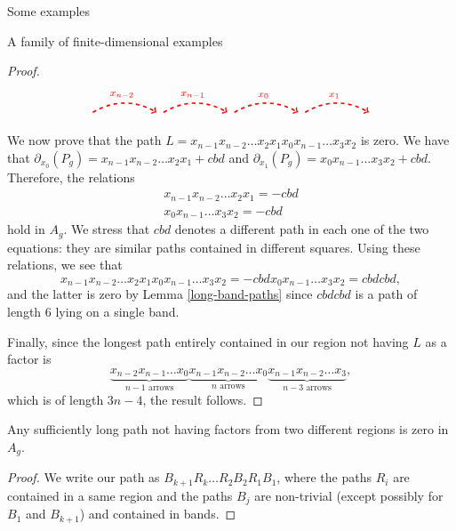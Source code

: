 \begin{chapter}{Some examples}
\begin{section}{A family of finite-dimensional examples}
\begin{proof}
\[\begin{tikzpicture}[text width=1.5mm, font=\footnotesize]
\draw[->, red, dashed, very thick] (-5+1.1, 2.1) to [bend left] node[above]{$\mathclap{x_{n-2}}$} (-5+2.9, 2.1);
\draw[->, red, dashed, very thick] (-3+1.1, 2.1) to [bend left] node[above]{$\mathclap{x_{n-1}}$} (-3+2.9, 2.1);
\draw[->, red, dashed, very thick] (-1+1.1, 2.1) to [bend left] node[above]{$\mathclap{x_{0}}$} (-1+2.9, 2.1);
\draw[->, red, dashed, very thick] (1+1.1, 2.1) to [bend left] node[above]{$\mathclap{x_{1}}$} (1+2.9, 2.1);
\end{tikzpicture}
\]

We now prove that the path $L=x_{n-1}x_{n-2}\dots x_2x_1x_{0}x_{n-1}\dots x_3x_2$ is zero. We have that $\partial_{x_0}(P_g)=x_{n-1}x_{n-2}\dots x_2x_1+cbd$ and $\partial_{x_1}(P_g)=x_{0}x_{n-1}\dots x_3x_2+cbd$. Therefore, the relations
\begin{align*}
x_{n-1}x_{n-2}\dots x_2x_1=-cbd\\
x_{0}x_{n-1}\dots x_3x_2=-cbd
\end{align*}
hold in $A_g$. We stress that $cbd$ denotes a different path in each one of the two equations: they are similar paths contained in different squares. Using these relations, we see that $$x_{n-1}x_{n-2}\dots x_2x_1x_{0}x_{n-1}\dots x_3x_2=-cbdx_{0}x_{n-1}\dots x_3x_2=cbdcbd,$$ and the latter is zero by Lemma \ref{long-band-paths} since $cbdcbd$ is a path of length 6 lying on a single band. 

Finally, since the longest path entirely contained in our region not having $L$ as a factor is
\[\underbrace{x_{n-2}x_{n-1}\dots x_0}_{\text{$n-1$ arrows}}\underbrace{x_{n-1}x_{n-2}\dots x_0}_{\text{$n$ arrows}}\underbrace{x_{n-1}x_{n-2}\dots x_3}_{\text{$n-3$ arrows}},\]
which is of length $3n-4$, the result follows.
\end{proof}

\begin{lemma} \label{long-br-paths} Any sufficiently long path not having factors from two different regions is zero in $A_g$.
\end{lemma}
\begin{proof} We write our path as $B_{k+1}R_k\dots R_2 B_2 R_1 B_1$, where the paths $R_i$ are contained in a same region and the paths $B_j$ are non-trivial (except possibly for $B_1$ and $B_{k+1}$) and contained in bands.


\end{proof}
\end{section}
\end{chapter}
